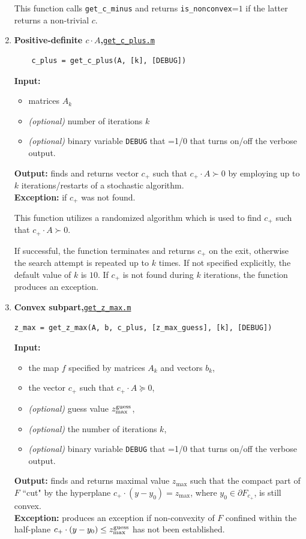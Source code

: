 \documentclass[a4paper]{article}
\theoremstyle{definition}
\begin{document}
\begin{enumerate}
	
This function calls {\tt get\_c\_minus} and returns  {\tt is\_nonconvex}=$1$ if the latter returns a non-trivial $c$. 


\item {\bf Positive-definite $c\cdot A$,\hskip 6pt}\underline{\tt get\_c\_plus.m}
\begin{verbatim}
	c_plus = get_c_plus(A, [k], [DEBUG])
\end{verbatim}

{\bf Input:}
\begin{itemize}
	\item matrices $A_k$
	\item {\it (optional)} number of iterations $k$
	\item {\it (optional)} binary variable {\tt DEBUG} that =1/0 that turns on/off the verbose output.
\end{itemize}
{\bf Output:} finds and returns vector $c_+$ such that $c_+\cdot A\succ 0$ by employing up to $k$ iterations/restarts of a stochastic algorithm.\\
{\bf Exception:} if $c_+$  was not found.
	
This function utilizes a randomized algorithm which is used to find $c_+$ such that $c_+\cdot A\succ 0$.

If successful, the function terminates and returns $c_+$ on the exit, otherwise the search attempt is repeated up to $k$ times.
If not specified explicitly, the default value of $k$ is $10$.
If $c_+$ is not found during $k$ iterations, the function produces an exception.

\newpage
	
\item {\bf Convex subpart,\hskip 6pt}\underline{\tt get\_z\_max.m}
\begin{verbatim}
z_max = get_z_max(A, b, c_plus, [z_max_guess], [k], [DEBUG])
\end{verbatim}
{\bf Input:}
\begin{itemize}
	\item the map $f$ specified by matrices $A_k$ and vectors $b_k$,
	\item the vector $c_+$ such that $c_+\cdot A\succeq 0$,
	\item {\it (optional)}  guess value  $z^{\rm guess}_{\rm max}$,
	\item {\it (optional)} the number of iterations $k$,
	\item {\it (optional)}  binary variable {\tt DEBUG} that =1/0 that turns on/off the verbose output.
\end{itemize}
{\bf Output:} finds and returns maximal value $z_{\max}$ such that the compact part of $F$ ``cut" by the hyperplane  $c_+ \cdot (y-y_0)=z_{\max}$, where $y_0\in \partial F_{c_+}$, is still convex. \\
{\bf Exception:} produces an exception if non-convexity of $F$ confined within the half-plane $c_+ \cdot (y-y_0)\leq z^{\rm guess}_{\rm max}$  has not been established. %


\end{enumerate}
\end{document}
